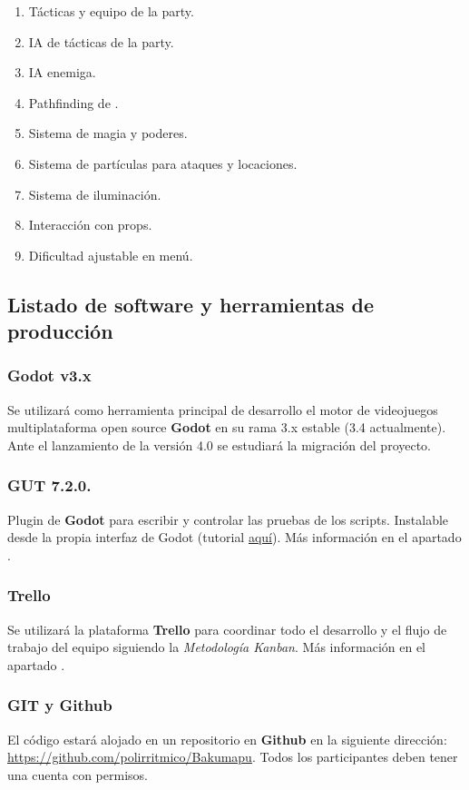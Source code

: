 \begin{enumerate}
\begin{enumerate}[noitemsep]
	\end{enumerate}
	\item Tácticas y equipo de la party.
	\item IA de tácticas de la party.
	\item IA enemiga.
	\item Pathfinding de .
	\item Sistema de magia y poderes.
	\item Sistema de partículas para ataques y locaciones.
	\item Sistema de iluminación.
	\item Interacción con props.
	\item Dificultad ajustable en menú.
\end{enumerate}

\subsection{Listado de software y herramientas de producción}\label{intro:software-y-herramientas}

\subsubsection{Godot v3.x}
Se utilizará como herramienta principal de desarrollo el motor de videojuegos multiplataforma open source \textbf{Godot} en su rama 3.x estable (3.4 actualmente). Ante el lanzamiento de la versión 4.0 se estudiará la migración del proyecto.

\subsubsection*{\small GUT 7.2.0.}
Plugin de \textbf{Godot} para escribir y controlar las pruebas de los scripts. Instalable desde la propia interfaz de Godot (tutorial \href{https://www.youtube.com/watch?v=5DrhMiuLRl0}{aquí}). Más información en el apartado .

\subsubsection{Trello}
Se utilizará la plataforma \textbf{Trello} para coordinar todo el desarrollo y el flujo de trabajo del equipo siguiendo la \emph{Metodología Kanban}. Más información en el apartado .

\subsubsection{GIT y Github}
El código estará alojado en un repositorio  en \textbf{Github} en la siguiente dirección: \url{https://github.com/polirritmico/Bakumapu}. Todos los participantes deben tener una cuenta con permisos.

